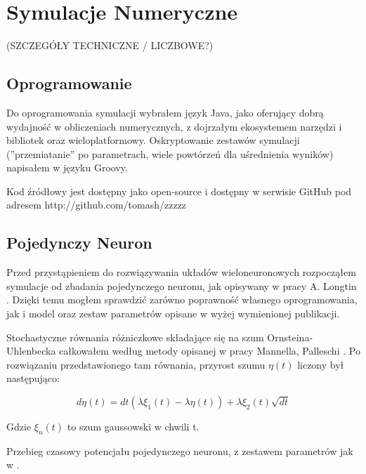   \section{Symulacje Numeryczne}
  
  (SZCZEGÓŁY TECHNICZNE / LICZBOWE?)
  
  
  \subsection{Oprogramowanie}

  Do oprogramowania symulacji wybrałem język Java, jako oferujący dobrą wydajność w obliczeniach numerycznych, z dojrzałym ekosystemem narzędzi i bibliotek oraz wieloplatformowy. Oskryptowanie zestawów symulacji (''przemiatanie'' po parametrach, wiele powtórzeń dla uśrednienia wyników) napisałem w języku Groovy.
  
  Kod źródłowy jest dostępny jako open-source i dostępny w serwisie GitHub pod adresem http://github.com/tomash/zzzzz
  
  \subsection{Pojedynczy Neuron}
  
  Przed przystąpieniem do rozwiązywania układów wieloneuronowych rozpocząłem symulacje od zbadania pojedynczego neuronu, jak opisywany w pracy A. Longtin \cite{longtin}. Dzięki temu mogłem sprawdzić zarówno poprawność własnego oprogramowania, jak i model oraz zestaw parametrów opisane w wyżej wymienionej publikacji.
  
  Stochastyczne równania różniczkowe składające się na szum Ornsteina-Uhlenbecka całkowałem według metody opisanej w pracy Mannella, Palleschi \cite{mannella}. Po rozwiązaniu przedstawionego tam równania, przyrost szumu $\eta (t)$ liczony był następująco:

  \begin{equation} \label{eq:deta}
    d\eta(t) = dt(\lambda \xi_1(t) - \lambda \eta(t)) + \lambda \xi_2(t) \sqrt{dt}
  \end{equation}

  Gdzie $\xi_n(t)$ to szum gaussowski w chwili t.
  
  Przebieg czasowy potencjału pojedynczego neuronu, z zestawem parametrów jak w \cite{longtin}.
  
